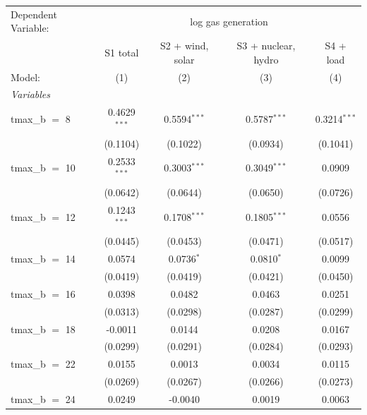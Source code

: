 
\begingroup
\centering
\begin{tabular}{lcccc}
   \tabularnewline \midrule \midrule
   Dependent Variable: & \multicolumn{4}{c}{log gas generation}\\
                      & S1 total       & S2 + wind, solar & S3 + nuclear, hydro & S4 + load \\   
   Model:             & (1)            & (2)              & (3)                 & (4)\\  
   \midrule
   \emph{Variables}\\
   tmax\_b $=$ 8      & 0.4629$^{***}$ & 0.5594$^{***}$   & 0.5787$^{***}$      & 0.3214$^{***}$\\   
                      & (0.1104)       & (0.1022)         & (0.0934)            & (0.1041)\\   
   tmax\_b $=$ 10     & 0.2533$^{***}$ & 0.3003$^{***}$   & 0.3049$^{***}$      & 0.0909\\   
                      & (0.0642)       & (0.0644)         & (0.0650)            & (0.0726)\\   
   tmax\_b $=$ 12     & 0.1243$^{***}$ & 0.1708$^{***}$   & 0.1805$^{***}$      & 0.0556\\   
                      & (0.0445)       & (0.0453)         & (0.0471)            & (0.0517)\\   
   tmax\_b $=$ 14     & 0.0574         & 0.0736$^{*}$     & 0.0810$^{*}$        & 0.0099\\   
                      & (0.0419)       & (0.0419)         & (0.0421)            & (0.0450)\\   
   tmax\_b $=$ 16     & 0.0398         & 0.0482           & 0.0463              & 0.0251\\   
                      & (0.0313)       & (0.0298)         & (0.0287)            & (0.0299)\\   
   tmax\_b $=$ 18     & -0.0011        & 0.0144           & 0.0208              & 0.0167\\   
                      & (0.0299)       & (0.0291)         & (0.0284)            & (0.0293)\\   
   tmax\_b $=$ 22     & 0.0155         & 0.0013           & 0.0034              & 0.0115\\   
                      & (0.0269)       & (0.0267)         & (0.0266)            & (0.0273)\\   
   tmax\_b $=$ 24     & 0.0249         & -0.0040          & 0.0019              & 0.0063\\   

\end{tabular}
